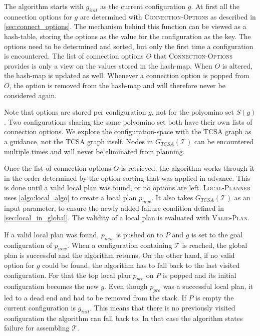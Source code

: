 The algorithm starts with $g_\textit{init}$ as the current configuration $g$.
At first all the connection options for $g$ are determined with {\scshape Connection-Options} as described in \autoref{sec:connect_options}.
The mechanism behind this function can be viewed as a hash-table, storing the options as the value for the configuration as the key.
The options need to be determined and sorted, but only the first time a configuration is encountered.
The list of connection options $O$ that {\scshape Connection-Options} provides is only a view on the values stored in the hash-map.
When $O$ is altered, the hash-map is updated as well.
Whenever a connection option is popped from $O$, the option is removed from the hash-map and will therefore never be considered again.

Note that options are stored per configuration $g$, not for the polyomino set $S(g)$.
Two configurations sharing the same polyomino set both have their own lists of connection options.
We explore the configuration-space with the TCSA graph as a guidance, not the TCSA graph itself.
Nodes in $G_{\textit{TCSA}}(\mathcal{T})$ can be encountered multiple times and will never be eliminated from planning.

Once the list of connection options $O$ is retrieved, the algorithm works through it in the order determined by the option sorting that was applied in advance.
This is done until a valid local plan was found, or no options are left.
{\scshape Local-Planner} uses \autoref{algo:local_algo} to create a local plan $p_\textit{new}$.
It also takes $G_{\textit{TCSA}}(\mathcal{T})$ as an input parameter, to ensure the newly added failure condition defined in \autoref{sec:local_in_global}.
The validity of a local plan is evaluated with {\scshape Valid-Plan}.

If a valid local plan was found, $p_\textit{new}$ is pushed on to $P$ and $g$ is set to the goal configuration of $p_\textit{new}$.
When a configuration containing $\mathcal{T}$ is reached, the global plan is successful and the algorithm returns.
On the other hand, if no valid option for $g$ could be found, the algorithm has to fall back to the last visited configuration.
For that the top local plan $p_\textit{pre}$ on $P$ is popped and its initial configuration becomes the new $g$.
Even though $p_\textit{pre}$ was a successful local plan, it led to a dead end and had to be removed from the stack.
If $P$ is empty the current configuration is $g_\textit{init}$.
This means that there is no previously visited configuration the algorithm can fall back to.
In that case the algorithm states failure for assembling $\mathcal{T}$.

